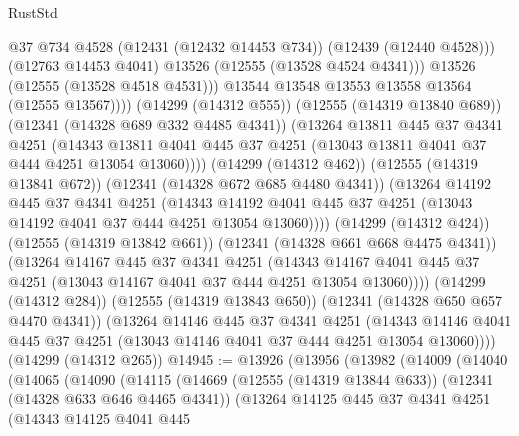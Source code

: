\begin{lexlean}{RustStd}
\begin{coremodule}
                        @37
                        @734
                        @4528
                        (@12431 (@12432 @14453 @734))
                        (@12439 (@12440 @4528)))
                      (@12763 @14453 @4041)
                      @13526
                      (@12555 (@13528 @4524 @4341)))
                    @13526
                    (@12555 (@13528 @4518 @4531)))
                  @13544
                  @13548
                  @13553
                  @13558
                  @13564
                  (@12555 @13567))))
            (@14299 (@14312 @555))
            (@12555 (@14319 @13840 @689))
            (@12341 (@14328 @689 @332 @4485 @4341))
            (@13264
              @13811
              @445
              @37
              @4341
              @4251
              (@14343
                @13811
                @4041
                @445
                @37
                @4251
                (@13043 @13811 @4041 @37 @444 @4251 @13054 @13060))))
          (@14299 (@14312 @462))
          (@12555 (@14319 @13841 @672))
          (@12341 (@14328 @672 @685 @4480 @4341))
          (@13264
            @14192
            @445
            @37
            @4341
            @4251
            (@14343
              @14192
              @4041
              @445
              @37
              @4251
              (@13043 @14192 @4041 @37 @444 @4251 @13054 @13060))))
        (@14299 (@14312 @424))
        (@12555 (@14319 @13842 @661))
        (@12341 (@14328 @661 @668 @4475 @4341))
        (@13264
          @14167
          @445
          @37
          @4341
          @4251
          (@14343 @14167 @4041 @445 @37 @4251 (@13043 @14167 @4041 @37 @444 @4251 @13054 @13060))))
      (@14299 (@14312 @284))
      (@12555 (@14319 @13843 @650))
      (@12341 (@14328 @650 @657 @4470 @4341))
      (@13264
        @14146
        @445
        @37
        @4341
        @4251
        (@14343 @14146 @4041 @445 @37 @4251 (@13043 @14146 @4041 @37 @444 @4251 @13054 @13060))))
    (@14299 (@14312 @265))
@14945 := @13926
    (@13956
      (@13982
        (@14009
          (@14040
            (@14065
              (@14090
                (@14115
                  (@14669
                    (@12555 (@14319 @13844 @633))
                    (@12341 (@14328 @633 @646 @4465 @4341))
                    (@13264
                      @14125
                      @445
                      @37
                      @4341
                      @4251
                      (@14343
                        @14125
                        @4041
                        @445

\end{coremodule}
\end{lexlean}
